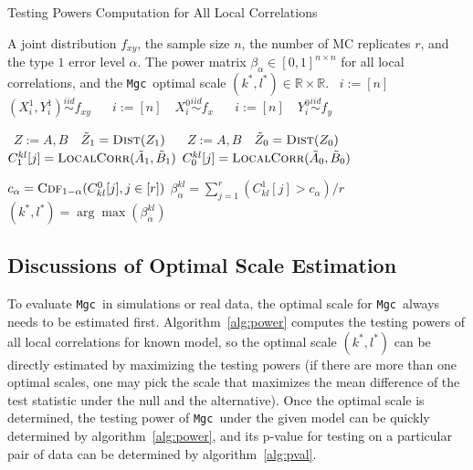 \documentclass[11pt]{article}
\providecommand{\sct}[1]{{\sc \texttt{#1}}}
\newcommand{\Real}{\mathbb{R}}
\newcommand{\G}{C}
\newcommand{\Linefor}[2]{%
    \State \algorithmicfor\ {#1}\ \algorithmicdo\ {#2} \algorithmicend\ \algorithmicfor%
}
\newcommand{\Mgc}{\sct{Mgc}}
\begin{document}
\begin{algorithm}
\caption{Testing Powers Computation for All Local Correlations}
\label{alg:power}
\begin{algorithmic}[1]
\Require A joint distribution $f_{xy}$, the sample size $n$, the number of MC replicates $r$, and the type $1$ error level $\alpha$.
\Ensure The power matrix $\beta_{\alpha} \in [0,1]^{n \times n}$ for all local correlations, and the \Mgc~optimal scale $(k^{*},l^{*}) \in \Real \times \Real$.
\Linefor{$i:=[n]$}{$(X^{1}_{i},Y^{1}_{i}) \stackrel{iid}{\sim} f_{xy}$} 
\Linefor{$i:=[n]$}{$X^{0}_{i} \stackrel{iid}{\sim} f_{x}$} 
\Linefor{$i:=[n]$}{$Y^{0}_{i} \stackrel{iid}{\sim} f_{y}$}
\Linefor{$Z:=A,B$}{$\tilde{Z}_{1}=\textsc{Dist}(Z_{1})$} 
\Linefor{$Z:=A,B$}{$\tilde{Z}_{0}=\textsc{Dist}(Z_{0})$} 
\State $\G^{kl}_{1}[j]=\textsc{LocalCorr}(\tilde{A}_{1},\tilde{B}_{1})$ 
\State $\G^{kl}_{0}[j]=\textsc{LocalCorr}(\tilde{A}_{0},\tilde{B}_{0})$ 
\EndFor

\State $c_{\alpha}=\textsc{Cdf}_{1-\alpha}(\G^{0}_{kl}[j],j \in [r])$ 
\State $\beta_{\alpha}^{kl}=\sum_{j=1}^{r}(\G^{1}_{kl}[j]>c_{\alpha}) / r$ 
\EndFor
\State $(k^{*},l^{*})=\arg\max(\beta_{\alpha}^{kl})$ 
\EndFunction
\end{algorithmic}
\end{algorithm}

\subsection{Discussions of Optimal Scale Estimation}
\label{appen:diss}
To evaluate \Mgc~in simulations or real data, the optimal scale for \Mgc~always needs to be estimated first. Algorithm~\ref{alg:power} computes the testing powers of all local correlations for known model, so the optimal scale $(k^{*},l^{*})$ can be directly estimated by maximizing the testing powers (if there are more than one optimal scales, one may pick the scale that maximizes the mean difference of the test statistic under the null and the alternative). Once the optimal scale is determined, the testing power of \Mgc~under the given model can be quickly determined by algorithm~\ref{alg:power}, and its p-value for testing on a particular pair of data can be determined by algorithm~\ref{alg:pval}.
\end{document}
